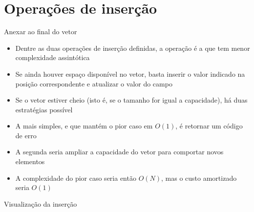 \section{Operações de inserção}

\begin{frame}[fragile]{Anexar ao final do vetor}

    \begin{itemize}
        \item Dentre as duas operações de inserção definidas, a operação
         é a que tem menor complexidade assintótica

        \item Se ainda houver espaço disponível no vetor, basta inserir o valor
        indicado na posição correspondente e atualizar o valor do campo 

        \item Se o vetor estiver cheio (isto é, se o tamanho for igual a capacidade), há 
        duas estratégias possível

        \item A mais simples, e que mantém o pior caso em $O(1)$, é retornar um código de erro

        \item A segunda seria ampliar a capacidade do vetor para comportar novos elementos

        \item A complexidade do pior caso seria então $O(N)$, mas o custo amortizado seria
        $O(1)$
    \end{itemize}

\end{frame}

\begin{frame}[fragile]{Visualização da inserção}


\end{frame}

